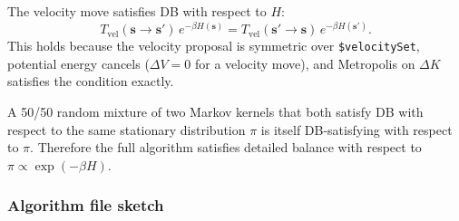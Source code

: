 \documentclass[12pt,a4paper]{article}
\begin{document}
The velocity move satisfies DB with respect to $H$:
\[
  T_{\text{vel}}(\mathbf{s} \to \mathbf{s}')\, e^{-\beta H(\mathbf{s})} =
  T_{\text{vel}}(\mathbf{s}' \to \mathbf{s})\, e^{-\beta H(\mathbf{s}')}.
\]
This holds because the velocity proposal is symmetric over
\texttt{\$velocitySet}, potential energy cancels ($\Delta V = 0$ for a velocity
move), and Metropolis on $\Delta K$ satisfies the condition exactly.

A 50/50 random mixture of two Markov kernels that both satisfy DB with respect
to the same stationary distribution $\pi$ is itself DB-satisfying with respect
to $\pi$.  Therefore the full algorithm satisfies detailed balance with respect
to $\pi \propto \exp(-\beta H)$.

\subsubsection*{Algorithm file sketch}
\end{document}
